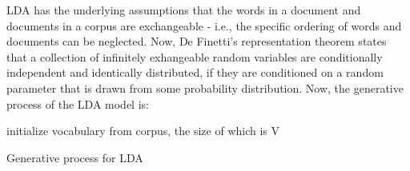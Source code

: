 \documentclass{article} %
\begin{document}

LDA has the underlying assumptions that the words in a document and documents
in a corpus are exchangeable - i.e., the specific ordering of words and
documents can be neglected. Now, De Finetti's representation theorem states that
a collection of infinitely exhangeable random variables are conditionally 
independent and identically distributed, if they are conditioned on a random
parameter that is drawn from some probability distribution. Now, the generative
process of the LDA model is:

\begin{algorithm}
initialize vocabulary from corpus, the size of which is V\;
\caption{Generative process for LDA}
\end{algorithm}
\end{document}
